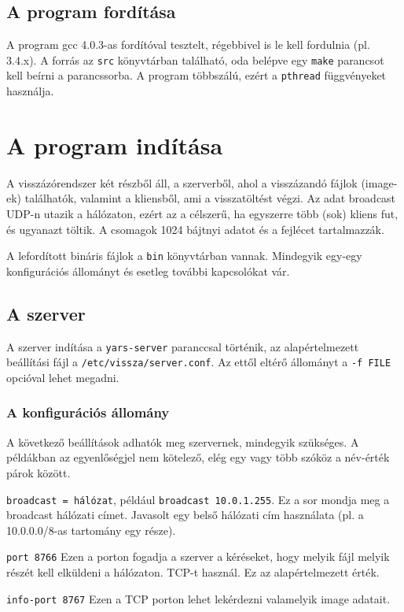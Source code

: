 \documentclass[fleqn,10pt,a4paper,titlepage]{article}
\begin{document}
  \subsection{A program fordítása}
  A program gcc 4.0.3-as fordítóval tesztelt, régebbivel is le kell fordulnia (pl. 3.4.x). A forrás az \texttt{src}
  könyvtárban található, oda belépve egy \texttt{make} parancsot kell beírni a parancssorba. A program többszálú, ezért
  a \texttt{pthread} függvényeket használja.

  \section{A program indítása}
  A visszázórendszer két részből áll, a szerverből, ahol a visszázandó fájlok (image-ek) találhatók, valamint a
  kliensből, ami a visszatöltést végzi. Az adat broadcast UDP-n utazik a hálózaton, ezért az a célszerű, ha egyszerre
  több (sok) kliens fut, és ugyanazt töltik. A csomagok 1024 bájtnyi adatot és a fejlécet tartalmazzák.

  A lefordított bináris fájlok a \texttt{bin} könyvtárban vannak. Mindegyik egy-egy konfigurációs állományt és esetleg
  további kapcsolókat vár.

  \subsection{A szerver}
  A szerver indítása a \texttt{yars-server} paranccsal történik, az alapértelmezett beállítási fájl a
  \texttt{/etc/vissza/server.conf}. Az ettől eltérő állományt a \texttt{-f FILE} opcióval lehet megadni.
  
  \subsubsection{A konfigurációs állomány}
  A következő beállítások adhatók meg szervernek, mindegyik szükséges. A példákban az egyenlőségjel nem kötelező, elég
  egy vagy több szóköz a név-érték párok között.
  
  \texttt{broadcast = hálózat}, például \texttt{broadcast 10.0.1.255}. Ez a sor mondja meg a broadcast hálózati
  címet. Javasolt egy belső hálózati cím használata (pl. a 10.0.0.0/8-as tartomány egy része).


  \texttt{port 8766} Ezen a porton fogadja a szerver a kéréseket, hogy melyik fájl melyik részét kell elküldeni a
  hálózaton. TCP-t használ. Ez az alapértelmezett érték.
  
  \texttt{info-port 8767} Ezen a TCP porton lehet lekérdezni valamelyik image adatait.
  
\end{document}
